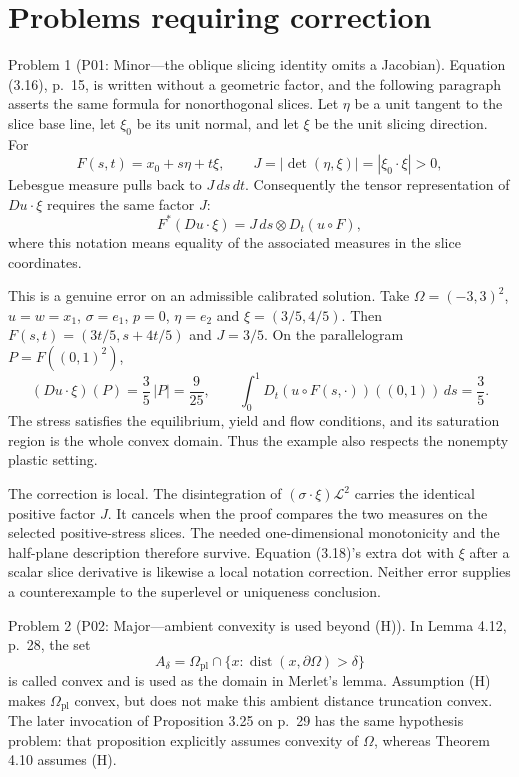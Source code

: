 \documentclass[10pt]{article}
\begin{document}
\section*{Problems requiring correction}
Problem 1 (P01: Minor—the oblique slicing identity omits a Jacobian).  Equation (3.16), p. 15, is written without a geometric factor, and the following paragraph asserts the same formula for nonorthogonal slices. Let \(\eta\) be a unit tangent to the slice base line, let \(\xi_0\) be its unit normal, and let \(\xi\) be the unit slicing direction. For \[F(s,t)=x_0+s\eta+t\xi,\qquad
 J=|\det(\eta,\xi)|=|\xi_0\cdot\xi|>0,\] Lebesgue measure pulls back to \(J\,ds\,dt\). Consequently the tensor representation of \(Du\cdot\xi\) requires the same factor \(J\): \[F^*(Du\cdot\xi)=J\,ds\otimes D_t(u\circ F),\] where this notation means equality of the associated measures in the slice coordinates.\par
This is a genuine error on an admissible calibrated solution. Take \(\Omega=(-3,3)^2\), \(u=w=x_1\), \(\sigma=e_1\), \(p=0\), \(\eta=e_2\) and \(\xi=(3/5,4/5)\). Then \(F(s,t)=(3t/5,s+4t/5)\) and \(J=3/5\). On the parallelogram \(P=F((0,1)^2)\), \[(Du\cdot\xi)(P)=\frac35\,|P|=\frac9{25},
 \qquad
 \int_0^1 D_t(u\circ F(s,\cdot))((0,1))\,ds=\frac35.\] The stress satisfies the equilibrium, yield and flow conditions, and its saturation region is the whole convex domain. Thus the example also respects the nonempty plastic setting.\par
The correction is local. The disintegration of \((\sigma\cdot\xi)\mathcal L^2\) carries the identical positive factor \(J\). It cancels when the proof compares the two measures on the selected positive-stress slices. The needed one-dimensional monotonicity and the half-plane description therefore survive. Equation (3.18)’s extra dot with \(\xi\) after a scalar slice derivative is likewise a local notation correction. Neither error supplies a counterexample to the superlevel or uniqueness conclusion.\par
Problem 2 (P02: Major—ambient convexity is used beyond (H)).  In Lemma 4.12, p. 28, the set \[A_\delta=\Omega_{\mathrm{pl}}\cap\{x:\operatorname{dist}(x,\partial\Omega)>\delta\}\] is called convex and is used as the domain in Merlet’s lemma. Assumption (H) makes \(\Omega_{\mathrm{pl}}\) convex, but does not make this ambient distance truncation convex. The later invocation of Proposition 3.25 on p. 29 has the same hypothesis problem: that proposition explicitly assumes convexity of \(\Omega\), whereas Theorem 4.10 assumes (H).\par
\end{document}
